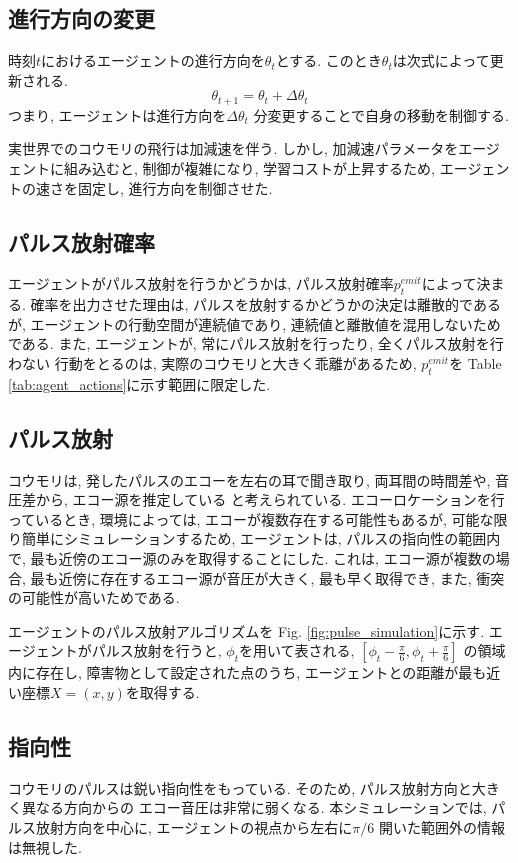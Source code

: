 \documentclass[../main]{subfiles}
\begin{document}
\subsection{進行方向の変更}
時刻$t$におけるエージェントの進行方向を$\theta_t$とする.
このとき$\theta_t$は次式によって更新される.
$$\theta_{t+1}=\theta_t+\Delta\theta_t$$
つまり, エージェントは進行方向を$\Delta\theta_t$
分変更することで自身の移動を制御する.

実世界でのコウモリの飛行は加減速を伴う.
しかし, 加減速パラメータをエージェントに組み込むと, 
制御が複雑になり, 学習コストが上昇するため, 
エージェントの速さを固定し, 進行方向を制御させた.

\subsection{パルス放射確率}
エージェントがパルス放射を行うかどうかは, 
パルス放射確率$p^{emit}_t$によって決まる.
確率を出力させた理由は, 
パルスを放射するかどうかの決定は離散的であるが, 
エージェントの行動空間が連続値であり, 
連続値と離散値を混用しないためである.
また, エージェントが, 
常にパルス放射を行ったり, 全くパルス放射を行わない
行動をとるのは, 実際のコウモリと大きく乖離があるため, 
$p^{emit}_t$を
Table \ref{tab:agent_actions}に示す範囲に限定した.

\subsection{パルス放射}
コウモリは, 発したパルスのエコーを左右の耳で聞き取り, 
両耳間の時間差や, 音圧差から, エコー源を推定している
と考えられている.
エコーロケーションを行っているとき, 
環境によっては, エコーが複数存在する可能性もあるが, 
可能な限り簡単にシミュレーションするため, 
エージェントは, パルスの指向性の範囲内で, 
最も近傍のエコー源のみを取得することにした.
これは, エコー源が複数の場合, 
最も近傍に存在するエコー源が音圧が大きく, 
最も早く取得でき, また, 衝突の可能性が高いためである.

エージェントのパルス放射アルゴリズムを
Fig. \ref{fig:pulse_simulation}に示す.
エージェントがパルス放射を行うと, 
$\phi_t$を用いて表される, 
$[\phi_t-\frac{\pi}{6}, \phi_t+\frac{\pi}{6}]$
の領域内に存在し, 障害物として設定された点のうち, 
エージェントとの距離が最も近い座標$X=(x, y)$を取得する.

\subsection{指向性}
コウモリのパルスは鋭い指向性をもっている.
そのため, パルス放射方向と大きく異なる方向からの
エコー音圧は非常に弱くなる.
本シミュレーションでは, パルス放射方向を中心に, 
エージェントの視点から左右に$\pi/6$
開いた範囲外の情報は無視した.
\end{document}
